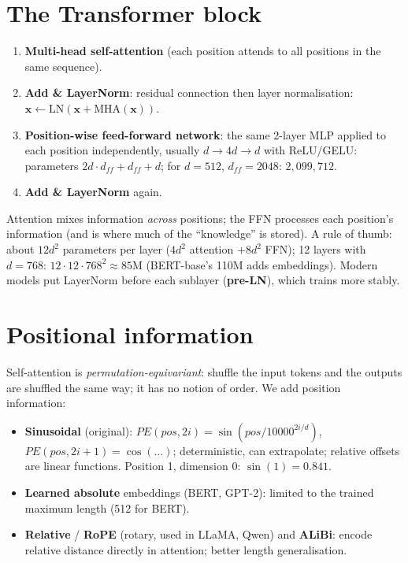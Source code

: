 \section{The Transformer block}
\begin{enumerate}
\item \textbf{Multi-head self-attention} (each position attends to all positions in the same sequence).
\item \textbf{Add \& LayerNorm}: residual connection then layer normalisation: $\mathbf x\leftarrow\text{LN}(\mathbf x + \text{MHA}(\mathbf x))$.
\item \textbf{Position-wise feed-forward network}: the same 2-layer MLP applied to each position independently, usually $d\to4d\to d$ with ReLU/GELU:
  parameters $2d\cdot d_{ff} + d_{ff} + d$; for $d = 512$, $d_{ff} = 2048$: $2{,}099{,}712$.
\item \textbf{Add \& LayerNorm} again.
\end{enumerate}
Attention mixes information \emph{across} positions; the FFN processes each position's information (and is where much of the ``knowledge'' is stored).
A rule of thumb: about $12d^2$ parameters per layer ($4d^2$ attention $+ 8d^2$ FFN); 12 layers with $d = 768$: $12\cdot12\cdot768^2\approx85$M (BERT-base's 110M
adds embeddings). Modern models put LayerNorm before each sublayer (\textbf{pre-LN}), which trains more stably.

\section{Positional information}
Self-attention is \emph{permutation-equivariant}: shuffle the input tokens and the outputs are shuffled the same way; it has no notion of order. We add
position information:
\begin{itemize}
\item \textbf{Sinusoidal} (original): $PE(pos, 2i) = \sin(pos/10000^{2i/d})$, $PE(pos, 2i+1) = \cos(\dots)$; deterministic, can extrapolate; relative offsets are
  linear functions. Position 1, dimension 0: $\sin(1) = 0.841$.
\item \textbf{Learned absolute} embeddings (BERT, GPT-2): limited to the trained maximum length (512 for BERT).
\item \textbf{Relative} / \textbf{RoPE} (rotary, used in LLaMA, Qwen) and \textbf{ALiBi}: encode relative distance directly in attention; better length generalisation.
\end{itemize}

